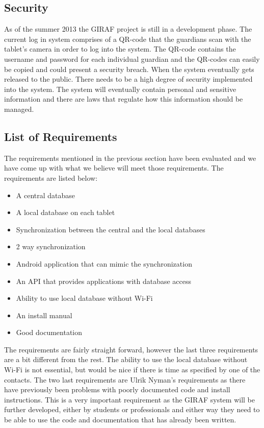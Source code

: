 \subsection{Security} %
\label{sub:security}
As of the summer 2013 the GIRAF project is still in a development phase. The current log in system comprises of a QR-code that the guardians scan with the tablet's camera in order to log into the system. The QR-code contains the username and password for each individual guardian and the QR-codes can easily be copied and could present a security breach. When the system eventually gets released to the public. There needs to be a high degree of security implemented into the system. The system will eventually contain personal and sensitive information and there are laws that regulate how this information should be managed.  

\subsection{List of Requirements} %
\label{sub:list_of_requirements}
The requirements mentioned in the previous section have been evaluated and we have come up with what we believe will meet those requirements. The requirements are listed below:

\begin{itemize}
	\item A central database
	\item A local database on each tablet		
	\item Synchronization between the central and the local databases
	\item 2 way synchronization
	\item Android application that can mimic the synchronization
	\item An API that provides applications with database access
	\item Ability to use local database without Wi-Fi
	\item An install manual
	\item Good documentation
\end{itemize}

The requirements are fairly straight forward, however the last three requirements are a bit different from the rest. The ability to use the local database without Wi-Fi is not essential, but would be nice if there is time as specified by one of the contacts. The two last requirements are Ulrik Nyman's requirements as there have previously been problems with poorly documented code and install instructions. This is a very important requirement as the GIRAF system will be further developed, either by students or professionals and either way they need to be able to use the code and documentation that has already been written.
